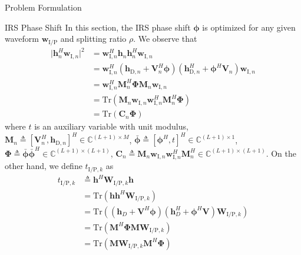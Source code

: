 \documentclass[journal]{IEEEtran}
\begin{document}
\begin{section}{Problem Formulation}
		\begin{subsection}{IRS Phase Shift}
			In this section, the IRS phase shift $\boldsymbol{\phi}$ is optimized for any given waveform $\boldsymbol{w}_{\mathrm{I/P}}$ and splitting ratio $\rho$. We observe that
			\begin{align}
				\lvert \boldsymbol{h}_{n}^H\boldsymbol{w}_{\mathrm{I},n} \rvert^2
				& = \boldsymbol{w}_{\mathrm{I},n}^H\boldsymbol{h}_n\boldsymbol{h}_n^H\boldsymbol{w}_{\mathrm{I},n}\nonumber\\
				& = \boldsymbol{w}_{\mathrm{I},n}^H(\boldsymbol{h}_{\mathrm{D},n}+\boldsymbol{V}_n^H\boldsymbol{\phi})(\boldsymbol{h}_{\mathrm{D},n}^H+\boldsymbol{\phi}^H\boldsymbol{V}_n)\boldsymbol{w}_{\mathrm{I},n}\nonumber\\
				& = \boldsymbol{w}_{\mathrm{I},n}^H\boldsymbol{M}_n^H\boldsymbol{\Phi}\boldsymbol{M}_n\boldsymbol{w}_{\mathrm{I},n}\nonumber\\
				& = \mathrm{Tr}(\boldsymbol{M}_n\boldsymbol{w}_{\mathrm{I},n}\boldsymbol{w}_{\mathrm{I},n}^H\boldsymbol{M}_n^H\boldsymbol{\Phi})\nonumber\\
				& = \mathrm{Tr}(\boldsymbol{C}_n\boldsymbol{\Phi})
			\end{align}
			where $t$ is an auxiliary variable with unit modulus, $\boldsymbol{M}_n \triangleq [\boldsymbol{V}_n^H, \boldsymbol{h}_{\mathrm{D},n}]^H \in \mathbb{C}^{(L+1) \times M}$, $\bar{\boldsymbol{\phi}} \triangleq [\boldsymbol{\phi}^H, t]^H \in \mathbb{C}^{(L+1) \times 1}$, $\boldsymbol{\Phi} \triangleq \bar{\boldsymbol{\phi}}\bar{\boldsymbol{\phi}}^H \in \mathbb{C}^{(L+1) \times (L+1)}$, $\boldsymbol{C}_n \triangleq \boldsymbol{M}_n\boldsymbol{w}_{\mathrm{I},n}\boldsymbol{w}_{\mathrm{I},n}^H\boldsymbol{M}_n^H \in \mathbb{C}^{(L+1)\times(L+1)}$. On the other hand, we define $t_{\mathrm{I/P},k}$ as
			\begin{align}
				t_{\mathrm{I/P},k}
				& \triangleq \boldsymbol{h}^H\boldsymbol{W}_{\mathrm{I/P},k}\boldsymbol{h}\nonumber\\
				& = \mathrm{Tr}(\boldsymbol{h}\boldsymbol{h}^H\boldsymbol{W}_{\mathrm{I/P},k})\nonumber\\
				& = \mathrm{Tr}\left((\boldsymbol{h}_{D}+\boldsymbol{V}^H\boldsymbol{\phi})(\boldsymbol{h}_{D}^H+\boldsymbol{\phi}^H\boldsymbol{V})\boldsymbol{W}_{\mathrm{I/P},k}\right)\nonumber\\
				& = \mathrm{Tr}(\boldsymbol{M}^H\boldsymbol{\Phi}\boldsymbol{M}\boldsymbol{W}_{\mathrm{I/P},k})\nonumber\\
				& = \mathrm{Tr}(\boldsymbol{M}\boldsymbol{W}_{\mathrm{I/P},k}\boldsymbol{M}^H\boldsymbol{\Phi})\nonumber\\

\end{align}
\end{subsection}
\end{section}
\end{document}
